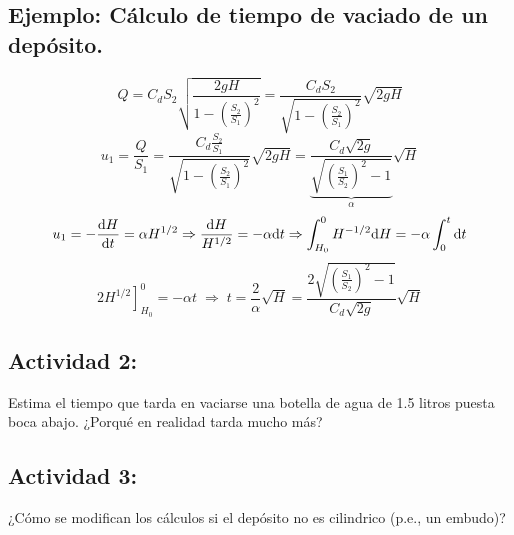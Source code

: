 	\subsection*{Ejemplo: Cálculo de tiempo de vaciado de un depósito.}
		\[
		Q=C_{d}S_{2}\sqrt{\frac{2gH}{1-\left(\frac{S_{2}}{S_{1}}\right)^{2}}}=\frac{C_{d}S_{2}}{\sqrt{1-\left(\frac{S_{2}}{S_{1}}\right)^{2}}}\sqrt{2gH}
		\]
		\[
		u_{1}=\frac{Q}{S_{1}}=\frac{C_{d}\frac{S_{2}}{S_{1}}}{\sqrt{1-\left(\frac{S_{2}}{S_{1}}\right)^{2}}}\sqrt{2gH}=\underbrace{\frac{C_{d}\sqrt{2g}}{\sqrt{\left(\frac{S_{1}}{S_{2}}\right)^{2}-1}}}_{\alpha}\sqrt{H}
		\]
		\[
		u_{1}=-\frac{\textrm{d} H}{\textrm{d} t}=\alpha H^{1/2}\Rightarrow\frac{\text{d} H}{H^{1/2}}=-\alpha\text{d} t\Rightarrow\int_{H_{0}}^{0}H^{-1/2}\text{d} H=-\alpha\int_{0}^{t}\text{d} t
		\]
		\[
		2\left.H^{1/2}\right]_{H_{0}}^{0}=-\alpha t\;\Rightarrow\;t=\frac{2}{\alpha}\sqrt{H}=\frac{2\sqrt{\left(\frac{S_{1}}{S_{2}}\right)^{2}-1}}{C_{d}\sqrt{2g}}\sqrt{H}
		\]

	
	\subsection*{Actividad 2:}
		Estima el tiempo que tarda en vaciarse una botella de agua de 1.5
		litros puesta boca abajo. ¿Porqué en realidad tarda mucho más?

	
	\subsection*{Actividad 3:}
		¿Cómo se modifican los cálculos si el depósito no es cilindrico (p.e.,
		un embudo)?

	